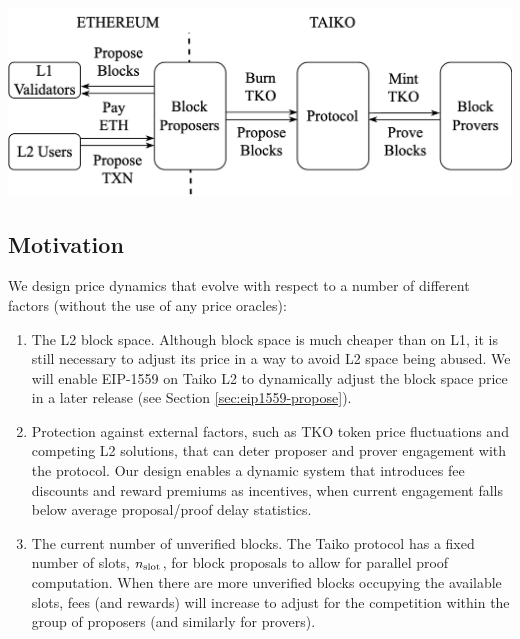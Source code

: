 \documentclass[9pt,oneside]{amsart}
\newenvironment{Figure}
  {\par\medskip\noindent\minipage{\linewidth}}
  {\endminipage\par\medskip}
\begin{document}
\begin{multicols}{2}
\begin{Figure}
 \centering
 \includegraphics[width=\linewidth]{fig/taikoEcosystemFin2.png}
 \label{fig:taiExchange}
 
\end{Figure}


\subsection{Motivation}
We design price dynamics that evolve with respect to a number of different factors (without the use of any price oracles):
\begin{enumerate}
\item The L2 block space. Although block space is much cheaper than on L1, it is still necessary to adjust its price in a way to avoid L2 space being abused. We will enable EIP-1559 on Taiko L2 to dynamically adjust the block space price in a later release (see Section \ref{sec:eip1559-propose}).
\item Protection against external factors, such as TKO token price fluctuations and competing L2 solutions, that can deter proposer and prover engagement with the protocol. Our design enables a dynamic system that introduces fee discounts and reward premiums as incentives, when current engagement falls below average proposal/proof delay statistics. 

\item The current number of unverified blocks. The Taiko protocol has a fixed number of slots, $n_\textnormal{slot}$, for block proposals to allow for parallel proof computation. When there are more unverified blocks occupying the available slots, fees (and rewards) will increase to adjust for the competition within the group of proposers (and similarly for provers).


\end{enumerate}
\end{multicols}
\end{document}
